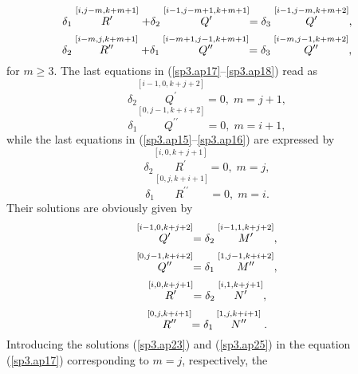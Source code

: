 \documentclass[a4paper,12pt]{article}
\begin{document}
\begin{equation}
\delta _{1}\stackrel{[i,j-m,k+m+1]}{R^{\prime }}+\delta _{2}\stackrel{%
[i-1,j-m+1,k+m+1]}{Q^{\prime }}=\delta _{3}\stackrel{[i-1,j-m,k+m+2]}{%
Q^{\prime }},  \label{sp3.ap17}
\end{equation}
\begin{equation}
\delta _{2}\stackrel{[i-m,j,k+m+1]}{R^{\prime \prime }}+\delta _{1}\stackrel{%
[i-m+1,j-1,k+m+1]}{Q^{\prime \prime }}=\delta _{3}\stackrel{[i-m,j-1,k+m+2]}{%
Q^{\prime \prime }},  \label{sp3.ap18}
\end{equation}
for $m\geq 3$. The last equations in (\ref{sp3.ap17}--\ref{sp3.ap18}) read
as 
\begin{equation}
\delta _{2}\stackrel{[i-1,0,k+j+2]}{Q^{\prime }}=0,\;m=j+1,  \label{sp3.ap19}
\end{equation}
\begin{equation}
\delta _{1}\stackrel{[0,j-1,k+i+2]}{Q^{\prime \prime }}=0,\;m=i+1,
\label{sp3.ap20}
\end{equation}
while the last equations in (\ref{sp3.ap15}--\ref{sp3.ap16}) are expressed
by 
\begin{equation}
\delta _{2}\stackrel{[i,0,k+j+1]}{R^{\prime }}=0,\;m=j,  \label{sp3.ap21}
\end{equation}
\begin{equation}
\delta _{1}\stackrel{[0,j,k+i+1]}{R^{\prime \prime }}=0,\;m=i.
\label{sp3.ap22}
\end{equation}
Their solutions are obviously given by 
\begin{equation}
\stackrel{\lbrack i-1,0,k+j+2]}{Q^{\prime }}=\delta _{2}\stackrel{%
[i-1,1,k+j+2]}{M^{\prime }},  \label{sp3.ap23}
\end{equation}
\begin{equation}
\stackrel{\lbrack 0,j-1,k+i+2]}{Q^{\prime \prime }}=\delta _{1}\stackrel{%
[1,j-1,k+i+2]}{M^{\prime \prime }},  \label{sp3.ap24}
\end{equation}
\begin{equation}
\stackrel{\lbrack i,0,k+j+1]}{R^{\prime }}=\delta _{2}\stackrel{[i,1,k+j+1]}{%
N^{\prime }},  \label{sp3.ap25}
\end{equation}
\begin{equation}
\stackrel{\lbrack 0,j,k+i+1]}{R^{\prime \prime }}=\delta _{1}\stackrel{%
[1,j,k+i+1]}{N^{\prime \prime }}.  \label{sp3.ap26}
\end{equation}
Introducing the solutions (\ref{sp3.ap23}) and (\ref{sp3.ap25}) in the
equation (\ref{sp3.ap17}) corresponding to $m=j$, respectively, the
\end{document}
